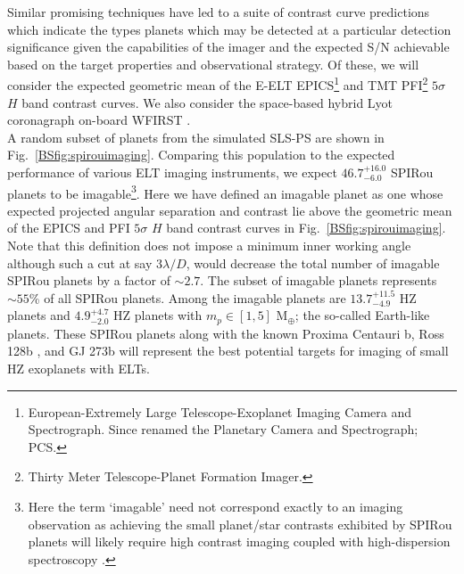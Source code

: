 Similar promising
techniques have led to a suite of contrast curve predictions which indicate the types planets
which may be detected at a particular detection significance given the capabilities of the
imager and the expected S/N achievable based on the target properties and observational strategy. Of these,
we will consider the expected geometric mean of the E-ELT
EPICS\footnote{European-Extremely Large Telescope-Exoplanet Imaging Camera and Spectrograph. Since renamed the
Planetary Camera and Spectrograph; PCS.}
\citep{kasper10} and TMT PFI\footnote{Thirty Meter Telescope-Planet Formation Imager.} \citep{macintosh06}
$5\sigma$ $H$ band contrast curves.
We also consider the space-based hybrid Lyot coronagraph on-board WFIRST \citep{trauger15}. \\

A random subset of planets from the simulated SLS-PS are shown in Fig.~\ref{BSfig:spirouimaging}.
Comparing this population to the expected performance 
of various ELT imaging instruments, we expect $46.7^{+16.0}_{-6.0}$ SPIRou planets to be
imagable\footnote{Here the term `imagable' need not correspond exactly to an imaging observation as achieving
    the small planet/star contrasts exhibited by SPIRou planets will likely require high contrast imaging
    coupled with high-dispersion spectroscopy \citep[e.g.][]{snellen15}.}.
Here we have defined an imagable planet as one whose expected projected angular separation and contrast
lie above the geometric mean of the EPICS and PFI $5\sigma$ $H$ band contrast curves in
Fig.~\ref{BSfig:spirouimaging}. Note that this definition does not impose a minimum inner working
  angle although such a cut at say $3 \lambda /D$, would decrease the total number of imagable SPIRou planets by
  a factor of $\sim 2.7$.
The subset of imagable planets represents $\sim 55$\% of all SPIRou planets. Among the imagable planets
are $13.7^{+11.5}_{-4.9}$ HZ planets and $4.9^{+4.7}_{-2.0}$ HZ planets with $m_p \in [1,5]$ M$_{\oplus}$; the so-called
Earth-like planets. These SPIRou planets along 
with the known Proxima Centauri b, Ross 128b \citep{bonfils17a}, and GJ 273b \citep{astudillodefru17a} 
will represent the best potential targets for imaging of small HZ exoplanets with ELTs. 

